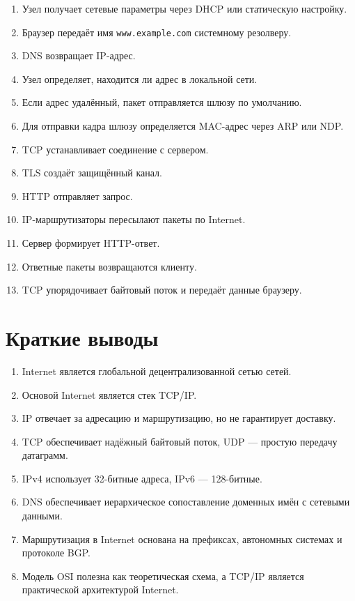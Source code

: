 \documentclass[12pt,a4paper]{article}
\begin{document}
\begin{enumerate}
    \item Узел получает сетевые параметры через DHCP или статическую настройку.
    \item Браузер передаёт имя \texttt{www.example.com} системному резолверу.
    \item DNS возвращает IP-адрес.
    \item Узел определяет, находится ли адрес в локальной сети.
    \item Если адрес удалённый, пакет отправляется шлюзу по умолчанию.
    \item Для отправки кадра шлюзу определяется MAC-адрес через ARP или NDP.
    \item TCP устанавливает соединение с сервером.
    \item TLS создаёт защищённый канал.
    \item HTTP отправляет запрос.
    \item IP-маршрутизаторы пересылают пакеты по Internet.
    \item Сервер формирует HTTP-ответ.
    \item Ответные пакеты возвращаются клиенту.
    \item TCP упорядочивает байтовый поток и передаёт данные браузеру.
\end{enumerate}

\section{Краткие выводы}

\begin{enumerate}
    \item Internet является глобальной децентрализованной сетью сетей.
    \item Основой Internet является стек TCP/IP.
    \item IP отвечает за адресацию и маршрутизацию, но не гарантирует доставку.
    \item TCP обеспечивает надёжный байтовый поток, UDP --- простую передачу датаграмм.
    \item IPv4 использует 32-битные адреса, IPv6 --- 128-битные.
    \item DNS обеспечивает иерархическое сопоставление доменных имён с сетевыми данными.
    \item Маршрутизация в Internet основана на префиксах, автономных системах и протоколе BGP.
    \item Модель OSI полезна как теоретическая схема, а TCP/IP является практической архитектурой Internet.
\end{enumerate}
\end{document}
